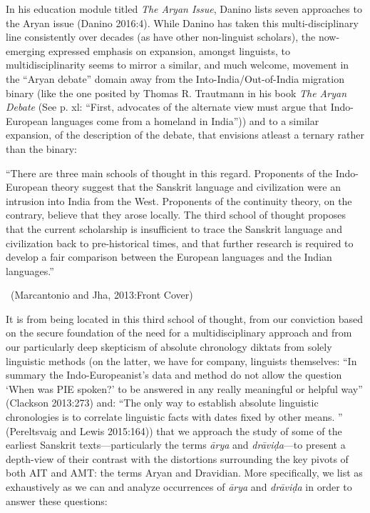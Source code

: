 In his education module titled \textit{The Aryan Issue}, Danino lists seven approaches to the Aryan issue (Danino 2016:4). While Danino has taken this multi-disciplinary line consistently over decades (as have other non-linguist scholars), the now-emerging expressed emphasis on expansion, amongst linguists, to multidisciplinarity seems to mirror a similar, and much welcome, movement in the “Aryan debate” domain away from the Into-India/Out-of-India migration binary (like the one posited by Thomas R. Trautmann in his book \textit{The Aryan Debate} (See p. xl: “First, advocates of the alternate view must argue that Indo-European languages come from a homeland in India”)) and to a similar expansion, of the description of the debate, that envisions atleast a ternary rather than the binary:

\begin{myquote}
“There are three main schools of thought in this regard. Proponents of the Indo-European theory suggest that the Sanskrit language and civilization were an intrusion into India from the West. Proponents of the continuity theory, on the contrary, believe that they arose locally. The third school of thought proposes that the current scholarship is insufficient to trace the Sanskrit language and civilization back to pre-historical times, and that further research is required to develop a fair comparison between the European languages and the Indian languages.”

~\hfill (Marcantonio and Jha, 2013:Front Cover)
\end{myquote}

It is from being located in this third school of thought, from our conviction based on the secure foundation of the need for a multidisciplinary approach and from our particularly deep skepticism of absolute chronology diktats from solely linguistic methods (on the latter, we have for company, linguists themselves: “In summary the Indo-Europeanist’s data and method do not allow the question ‘When was PIE spoken?’ to be answered in any really meaningful or helpful way” (Clackson 2013:273) and: “The only way to establish absolute linguistic chronologies is to correlate linguistic facts with dates fixed by other means. ” (Pereltsvaig and Lewis 2015:164)) that we approach the study of some of the earliest Sanskrit texts—particularly the terms \textit{ārya} and \textit{drāviḍa}—to present a depth-view of their contrast with the distortions surrounding the key pivots of both AIT and AMT: the terms Aryan and Dravidian. More specifically, we list as exhaustively as we can and analyze occurrences of \textit{ārya} and \textit{drāviḍa }in order to answer these questions:


